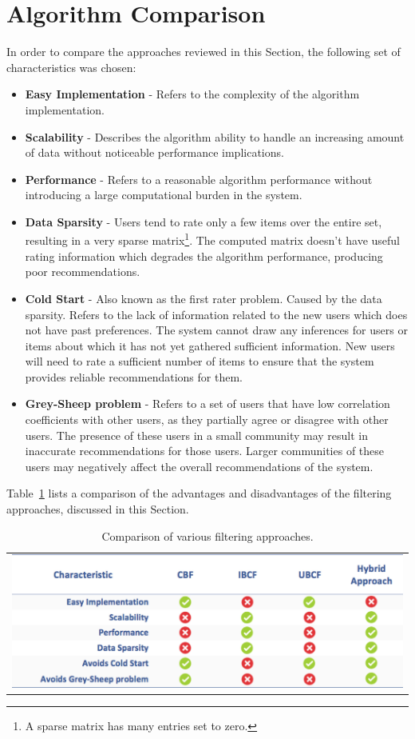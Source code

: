 \section{Algorithm Comparison}
\label{sec:cbtda}

In order to compare the approaches reviewed in this Section, the following set of characteristics was chosen:
\begin{itemize}
\item \textbf{Easy Implementation} - Refers to the complexity of the algorithm implementation.
\item \textbf{Scalability} - Describes the algorithm ability to handle an increasing amount of data without noticeable performance implications.
\item \textbf{Performance} - Refers to a reasonable algorithm performance without introducing a large computational burden in the system.
\item \textbf{Data Sparsity} - Users tend to rate only a few items over the entire set, resulting in a very sparse matrix\footnote{A sparse matrix has many entries set to zero.}. The computed matrix doesn't have useful rating information which degrades the algorithm performance, producing poor recommendations.
\item \textbf{Cold Start} - Also known as the first rater problem. Caused by the data sparsity. Refers to the lack of information related to the new users which does not have past preferences. The system cannot draw any inferences for users or items about which it has not yet gathered sufficient information. New users will need to rate a sufficient number of items to ensure that the system provides reliable recommendations for them.
\item \textbf{Grey-Sheep problem} - Refers to a set of users that have low correlation coefficients with other users, as they partially agree or disagree with other users. The presence of these users in a small community may result in inaccurate recommendations for those users. Larger communities of these users may negatively affect the overall recommendations of the system.
\end{itemize}
Table~\ref{tab:filterComparison} lists a comparison of the advantages and disadvantages of the filtering approaches, discussed in this Section.
\begin{center}
\begin{table}
	\centering
    \caption{Comparison of various filtering approaches.}
    \label{tab:filterComparison}
    \begin{tabular}{c}
	\includegraphics[width=13cm]{./images/tables/table_filter_comparison.jpg}    
    \end{tabular}
    \end{table}
\end{center}
